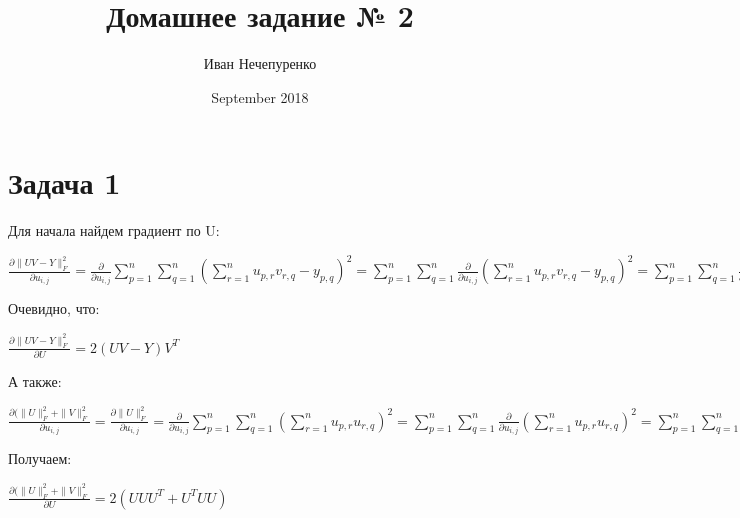 \documentclass{article}
\title{Домашнее задание № 2}
\author{Иван Нечепуренко }
\date{September 2018}
\begin{document}
\maketitle

\section{Задача 1} Для начала найдем градиент по U:

$ \displaystyle
\frac{\partial \|UV - Y\|^2_F}{\partial u_{i, j}} = \frac{\partial}{\partial u_{i, j}}
\sum\limits_{p = 1}^n\sum\limits_{q = 1}^n(\sum\limits_{r = 1}^n
u_{p, r}v_{r, q} - y_{p, q})^2 = 
\sum\limits_{p = 1}^n\sum\limits_{q = 1}^n 
 \frac{\partial}{\partial u_{i, j}}
(\sum\limits_{r = 1}^n
u_{p, r}v_{r, q} - y_{p, q})^2 
= \sum\limits_{p = 1}^n\sum\limits_{q = 1}^n 
 \frac{\partial}{\partial u_{i, j}}
(\sum\limits_{r = 1}^nu_{p, r}v_{r, q} - y_{p, q})^2 =
\sum\limits_{p = 1}^n\sum\limits_{q = 1}^n 
2(\sum\limits_{r = 1}^nu_{p, r}v_{r, q} - y_{p, q})
 \frac{\partial}{\partial u_{i, j}}(\sum\limits_{r = 1}^nu_{p, r}v_{r, q} - y_{p, q}) =
 \sum\limits_{p = 1}^n\sum\limits_{q = 1}^n 
2(\sum\limits_{r = 1}^nu_{p, r}v_{r, q} - y_{p, q})
Id(p = i)v_{j, q} =
\sum\limits_{q = 1}^n 
2(\sum\limits_{r = 1}^nu_{i, r}v_{r, q} - y_{i, q})v_{j, q} 
$

Очевидно, что:

$\displaystyle  \frac{\partial \|UV - Y\|^2_F}{\partial U } = 2(UV -Y)V^T$

А также:

$\displaystyle
\frac{\partial (\|U\|^2_F + \|V\|^2_F}{\partial u_{i, j}} = 
\frac{\partial \|U\|^2_F}{\partial u_{i, j}} = 
\frac{\partial}{\partial u_{i, j}}
\sum\limits_{p = 1}^n\sum\limits_{q = 1}^n(\sum\limits_{r = 1}^nu_{p, r}u_{r, q})^2 =
\sum\limits_{p = 1}^n\sum\limits_{q = 1}^n
\frac{\partial}{\partial u_{i, j}}(\sum\limits_{r = 1}^nu_{p, r}u_{r, q})^2 = %
\sum\limits_{p = 1}^n\sum\limits_{q = 1}^n
2(\sum\limits_{r = 1}^nu_{p, r}u_{r, q})
\frac{\partial}{\partial u_{i, j}}(\sum\limits_{r = 1}^nu_{p, r}u_{r, q}) = 
\sum\limits_{p = 1}^n\sum\limits_{q = 1}^n 2 (\sum\limits_{r = 1}^nu_{p, r}u_{r, q})
(Id(p = i)u_{j, q} + u_{p, i}Id(q = j)) = 
2 \sum\limits_{q = 1}^n (\sum\limits_{r = 1}^nu_{i, r}u_{r, q}) u_{j, q} + 
2 \sum\limits_{p = 1}^n (\sum\limits_{r = 1}^nu_{p, r}u_{r, j})u_{p, i}
$

Получаем:

$\displaystyle
\frac{\partial (\|U\|^2_F + \|V\|^2_F}{\partial U} = 
2(UUU^T + U^TUU)
$
\end{document}
